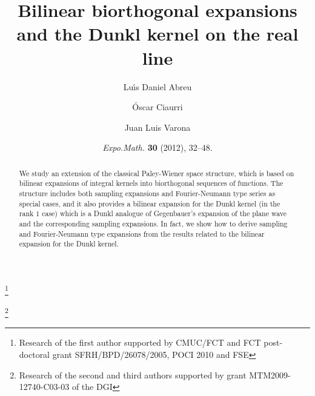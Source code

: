 \documentclass[11pt,a4paper]{amsart}
\theoremstyle{plain}
\theoremstyle{definition}
\begin{document}


\renewcommand\datename{\textbf{THIS PAPER HAS BEEN PUBLISHED IN}}
\date{\textit{Expo.\@ Math.\@} \textbf{30} (2012), 32--48.} 

\title[Bilinear biorthogonal expansions]{%
Bilinear biorthogonal expansions and the Dunkl kernel on the real line}



\author[L. D. Abreu]{Lu\'{\i}s Daniel Abreu}
\address{CMUC and Departamento de Matem\'atica,
Universidade de Coimbra,
Faculdade de Ci\^{e}ncias e Tecnologia (FCTUC),
3001-454 Coimbra, Portugal}
\thanks{Research of the first author supported by CMUC/FCT and FCT post-doctoral grant SFRH/BPD/26078/2005, POCI 2010 and FSE}

\author[\'O. Ciaurri]{\'Oscar Ciaurri}
\address{CIME and Departamento de Matem\'aticas y Computaci\'on,
Universidad de La Rioja, %
26004 Logro\~no, Spain}

\author[J. L. Varona]{Juan Luis Varona}
\address{CIME and Departamento de Matem\'aticas y Computaci\'on,
Universidad de La Rioja, %
26004 Logro\~no, Spain}
\thanks{Research of the second and third authors supported by grant MTM2009-12740-C03-03 of the DGI}



\begin{abstract}
We study an extension of the classical Paley-Wiener space structure, which is based on bilinear expansions of integral kernels into biorthogonal sequences of functions. The structure includes both sampling expansions and Fourier-Neumann type series as special cases, and it also provides a bilinear expansion for the Dunkl kernel (in the rank $1$ case) which is a Dunkl analogue of Gegenbauer's expansion of the plane wave and the corresponding sampling expansions. In fact, we show how to derive sampling and Fourier-Neumann type expansions from the results related to the bilinear expansion for the Dunkl kernel.
\end{abstract}
\end{document}
